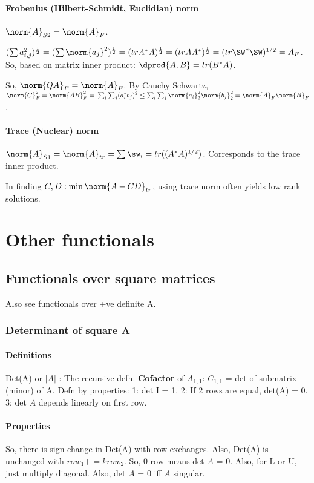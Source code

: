 \documentclass[oneside, article]{memoir}
\begin{document}
\subsubsection{Frobenius (Hilbert-Schmidt, Euclidian) norm}
$\norm{A}_{S2} = \norm{A}_{F}$.

$(\sum a_{i,j}^{2})^{\frac{1}{2}} = (\sum \norm{a_{j}}^{2})^{\frac{1}{2}} = (tr A^{*}A)^{\frac{1}{2}} = (tr AA^{*})^{\frac{1}{2}} = (tr \SW^{*}\SW)^{1/2} = A_{F}$. So, based on matrix inner product: $\dprod{A,B} = tr(B^{*}A)$.

So, $\norm{QA}_{F}=\norm{A}_{F}$. By Cauchy Schwartz, $\norm{C}_{F}^{2} = \norm{AB}_{F}^{2} = \\
\sum_{i}\sum_{j} (a_{i}^{*}b_{j})^{2} \leq \sum_{i}\sum_{j} \norm{a_{i}}_{2}^{2}\norm{b_{j}}_{2}^{2} =\norm{A}_{F}\norm{B}_{F}$.

\subsubsection{Trace (Nuclear) norm}
$\norm{A}_{S1} = \norm{A}_{tr} = \sum \sw_{i} = tr((A^{*}A)^{1/2})$. Corresponds to the trace inner product.

In finding $C,D: \min \norm{A - CD}_{tr}$, using trace norm often yields low rank solutions. \chk

\chapter{Other functionals}
\section{Functionals over square matrices}
Also see functionals over +ve definite A.

\subsection{Determinant of square A}
\subsubsection{Definitions}
Det(A) or $|A|$ : The recursive defn. \textbf{Cofactor} of $A_{1,1}$: $C_{1,1}$ = det of submatrix (minor) of A. Defn by properties: 1: det I = 1. 2: If 2 rows are equal, det(A) = 0. 3: det $A$ depends linearly on first row.

\subsubsection{Properties}
So, there is sign change in Det(A) with row exchanges. Also, Det(A) is unchanged with $row_{1} += k row_{2}$. So, 0 row means det $A$ = 0. Also, for L or U, just multiply diagonal. Also, det $A$ = 0 iff $A$ singular.
\end{document}
